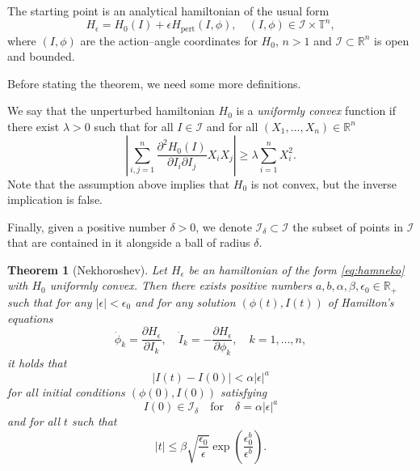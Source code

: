 \documentclass[english,fontsize=11pt,paper=a5,oneside]{scrbook}
\newcommand{\cI}{\mathcal{I}}
\newcommand{\R}{\mathbb{R}}
\newtheorem{theorem}{Theorem}[chapter]
\theoremstyle{definition}
\begin{document}
The starting point is an analytical hamiltonian of the usual form
\begin{equation}\label{eq:hamneko}
  H_\epsilon = H_0(I) + \epsilon H_{\mathrm{pert}}(I, \phi), \quad (I,\phi)\in \cI\times\mathbb{T}^n,
\end{equation}
where $(I,\phi)$ are the action--angle coordinates for $H_0$, $n>1$ and $\cI\subset\R^n$ is open and bounded.

Before stating the theorem, we need some more definitions.

We say that the unperturbed hamiltonian $H_0$ is a \emph{uniformly convex} function if there exist $\lambda >0$ such that for all $I\in\cI$ and for all $(X_1, \ldots, X_n)\in\R^n$
\begin{equation}
  \left| \sum_{i,j=1}^n \frac{\partial^2 H_0(I)}{\partial I_i \partial I_j} X_i X_j\right| \geq \lambda \sum_{i=1}^n X_i^2.
\end{equation}
Note that the assumption above implies that $H_0$ is not convex, but the inverse implication is false.

Finally, given a positive number $\delta >0$, we denote $\cI_\delta \subset\cI$ the subset of points in $\cI$ that are contained in it alongside a ball of radius $\delta$.

\begin{theorem}[Nekhoroshev]
  Let $H_\epsilon$ be an hamiltonian of the form \eqref{eq:hamneko} with $H_0$ uniformly convex.
  Then there exists positive numbers $a,b,\alpha,\beta,\epsilon_0\in\R_+$ such that for any $|\epsilon|< \epsilon_0$ and for any solution $(\phi(t), I(t))$ of Hamilton's equations
  \begin{equation}
    \dot \phi_k = \frac{\partial H_\epsilon}{\partial I_k}, \quad
    \dot I_k = - \frac{\partial H_\epsilon}{\partial \phi_k}, \quad
    k=1,\ldots,n,
  \end{equation}
  it holds that
  \begin{equation}
    |I(t)-I(0)| < \alpha |\epsilon|^a
  \end{equation}
  for all initial conditions $(\phi(0), I(0))$ satisfying
  \begin{equation}
    I(0) \in \cI_\delta\quad\mbox{for}\quad \delta = \alpha|\epsilon|^a
  \end{equation}
  and for all $t$ such that
  \begin{equation}
    |t| \leq \beta \sqrt{\frac{\epsilon_0}\epsilon} \exp\left(\frac{\epsilon^b_0}{\epsilon^b}\right).
  \end{equation}
\end{theorem}
\end{document}
